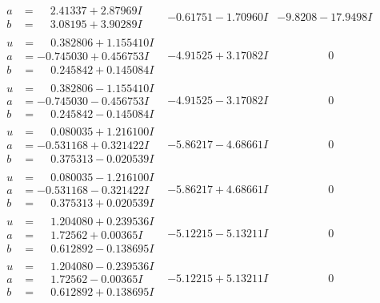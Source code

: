 \documentclass[1p]{elsarticle_modified}
\theoremstyle{definition}
\begin{document}
$$\begin{array}{c|c|c}
\begin{aligned}
a &= \phantom{-}2.41337 + 2.87969 I \\
b &= \phantom{-}3.08195 + 3.90289 I\end{aligned}
 & -0.61751 - 1.70960 I & -9.8208 - 17.9498 I \\ \hline\begin{aligned}
u &= \phantom{-}0.382806 + 1.155410 I \\
a &= -0.745030 + 0.456753 I \\
b &= \phantom{-}0.245842 + 0.145084 I\end{aligned}
 & -4.91525 + 3.17082 I & \phantom{-0.000000 } 0 \\ \hline\begin{aligned}
u &= \phantom{-}0.382806 - 1.155410 I \\
a &= -0.745030 - 0.456753 I \\
b &= \phantom{-}0.245842 - 0.145084 I\end{aligned}
 & -4.91525 - 3.17082 I & \phantom{-0.000000 } 0 \\ \hline\begin{aligned}
u &= \phantom{-}0.080035 + 1.216100 I \\
a &= -0.531168 + 0.321422 I \\
b &= \phantom{-}0.375313 - 0.020539 I\end{aligned}
 & -5.86217 - 4.68661 I & \phantom{-0.000000 } 0 \\ \hline\begin{aligned}
u &= \phantom{-}0.080035 - 1.216100 I \\
a &= -0.531168 - 0.321422 I \\
b &= \phantom{-}0.375313 + 0.020539 I\end{aligned}
 & -5.86217 + 4.68661 I & \phantom{-0.000000 } 0 \\ \hline\begin{aligned}
u &= \phantom{-}1.204080 + 0.239536 I \\
a &= \phantom{-}1.72562 + 0.00365 I \\
b &= \phantom{-}0.612892 - 0.138695 I\end{aligned}
 & -5.12215 - 5.13211 I & \phantom{-0.000000 } 0 \\ \hline\begin{aligned}
u &= \phantom{-}1.204080 - 0.239536 I \\
a &= \phantom{-}1.72562 - 0.00365 I \\
b &= \phantom{-}0.612892 + 0.138695 I\end{aligned}
 & -5.12215 + 5.13211 I & \phantom{-0.000000 } 0 \\ \hline\begin{aligned}

\end{aligned}
\end{array}$$
\end{document}
